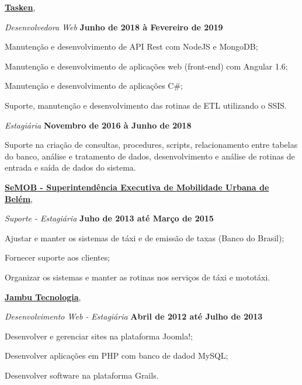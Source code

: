 \documentclass[10pt]{article}
\newenvironment{outerlist}[1][\enskip\textbullet]%
{\begin{itemize}[#1]}{\end{itemize}%
    \vspace{-1em}}
\newenvironment{innerlist}[1][\enskip\textbullet]%
          {\begin{compactitem}[#1]}{\end{compactitem}}
\newcommand{\blankline}{\quad\pagebreak[2]}
\begin{document}
				\href{http://tasken.com}{\textbf{Tasken}},
				\begin{outerlist}
					\item[] \textit{Desenvolvedora Web}
					\hfill \textbf{Junho de 2018 à Fevereiro de 2019}
					\begin{innerlist}
						\item Manutenção e desenvolvimento de API Rest com NodeJS e MongoDB;
						\item Manutenção e desenvolvimento de aplicações web (front-end) com Angular 1.6;
						\item Manutenção e desenvolvimento de aplicações C\#;
						\item Suporte, manutenção e desenvolvimento das rotinas de ETL utilizando o SSIS.
					\end{innerlist}
				
					\item[] \textit{Estagiária}
					\hfill \textbf{Novembro de 2016 à Junho de 2018}
					\begin{innerlist}
						\item Suporte na criação de consultas, procedures, scripts, relacionamento entre tabelas do banco, análise e tratamento de dados, desenvolvimento e análise de rotinas de entrada e saída de dados do sistema.
					\end{innerlist}
				
				\end{outerlist}                	
				\blankline

    
				\href{http://www.belem.pa.gov.br/semob/site/}{\textbf{SeMOB - Superintendência Executiva de Mobilidade Urbana de Belém}},
				\begin{outerlist}
					\item[] \textit{Suporte - Estagiária}
					\hfill \textbf{Juho de 2013 até Março de 2015}
					\begin{innerlist}
						\item Ajustar e manter os sistemas de táxi e de emissão de taxas (Banco do Brasil);
						\item Fornecer suporte aos clientes;
						\item Organizar os sistemas e manter as rotinas nos serviços de táxi e mototáxi.
					\end{innerlist}
				\end{outerlist}                	
				\blankline

				\href{http://jambu.com.br}{\textbf{Jambu Tecnologia}},
				\begin{outerlist}
					\item[] \textit{Desenvolvimento Web - Estagiária}
					\hfill \textbf{Abril de 2012 até Julho de 2013}
					\begin{innerlist}
						\item Desenvolver e gerenciar sites na plataforma Joomla!;
						\item Desenvolver aplicações em PHP com banco de dadod MySQL;
						\item Desenvolver software na plataforma Grails.
					\end{innerlist}
				\end{outerlist}                	
				\blankline
				
\end{document}
